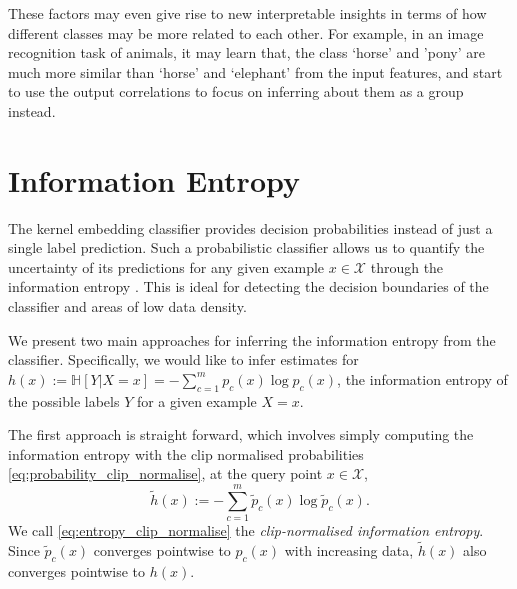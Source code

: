 \documentclass{article}
\begin{document}
\begin{itemize}
		These factors may even give rise to new interpretable insights in terms of how different classes may be more related to each other. For example, in an image recognition task of animals, it may learn that, the class `horse' and 'pony' are much more similar than `horse' and `elephant' from the input features, and start to use the output correlations to focus on inferring about them as a group instead.
		\end{itemize}
	
\small



\newpage
\appendix

\section{Information Entropy}
\label{sec:information_entropy}

	The kernel embedding classifier provides decision probabilities instead of just a single label prediction. Such a probabilistic classifier allows us to quantify the uncertainty of its predictions for any given example $x \in \mathcal{X}$ through the information entropy \citep{shannon1951prediction, jaynes1957information}. This is ideal for detecting the decision boundaries of the classifier and areas of low data density.
	
	We present two main approaches for inferring the information entropy from the classifier. Specifically, we would like to infer estimates for $h(x) := \mathbb{H}[Y | X = x] = - \sum_{c = 1}^{m} p_{c}(x) \log{p_{c}(x)} $, the information entropy of the possible labels $Y$ for a given example $X = x$.
	
	The first approach is straight forward, which involves simply computing the information entropy with the clip normalised probabilities \eqref{eq:probability_clip_normalise}, at the query point $x \in \mathcal{X}$,
	\begin{equation}
		\tilde{h}(x) := - \sum_{c = 1}^{m} \tilde{p}_{c}(x) \log{\tilde{p}_{c}(x)}.
	\label{eq:entropy_clip_normalise}
	\end{equation}
	We call \eqref{eq:entropy_clip_normalise} the \textit{clip-normalised information entropy}. Since $\tilde{p}_{c}(x)$ converges pointwise to $p_{c}(x)$ with increasing data, $\tilde{h}(x)$ also converges pointwise to $h(x)$.
	
\end{document}
